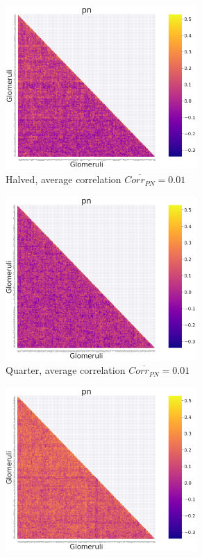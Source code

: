 \begin{figure}
\begin{subfigure}[t]{0.45\textwidth}
    \includegraphics[width=0.8\textwidth]{correlation-halved-poisson-pn}
    \caption{Halved, average correlation $\overline{Corr_{PN}} = 0.01$}
    \label{fig:halved_state}
  \end{subfigure}
  \begin{subfigure}[t]{0.45\textwidth}
    \centering
    \includegraphics[width=0.8\textwidth]{correlation-quarter-poisson-pn}
    \caption{Quarter, average correlation $\overline{Corr_{PN}} = 0.01$}
    \label{fig:quarter_state}
  \end{subfigure}
  \begin{subfigure}[t]{0.45\textwidth}
    \centering
    \includegraphics[width=0.8\textwidth]{correlation-tenth-poisson-pn}

\end{subfigure}
\end{figure}
